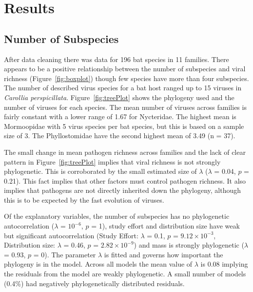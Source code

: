 
\section{Results}


\subsection{Number of Subspecies}

After data cleaning there was data for 196 bat species in 11 families.
There appears to be a positive relationship between the number of subspecies and viral richness (Figure~\ref{fig:boxplot}) though few species have more than four subspecies. 
The number of described virus species for a bat host ranged up to 15 viruses in \emph{Carollia perspicillata}.
Figure~\ref{fig:treePlot} shows the phylogeny used and the number of viruses for each species.
The mean number of viruses across families is fairly constant with a lower range of 1.67 for Nycteridae.
The highest mean is Mormoopidae with 5 virus species per bat species, but this is based on a sample size of 3.
The Phyllostomidae have the second highest mean  of 3.49 (n = 37).

The small change in mean pathogen richness across families and the lack of clear pattern in Figure~\ref{fig:treePlot} implies that viral richness is not strongly phylogenetic. 
This is corroborated by the small estimated size of $\lambda$ ($\lambda$ = 0.04, $p$ = 0.21).
This fact implies that other factors must control pathogen richness.
It also implies that pathogens are not directly inherited down the phylogeny, although this is to be expected by the fast evolution of viruses.

Of the explanatory variables, the number of subspecies has no phylogenetic autocorrelation ($\lambda$ = \ensuremath{10^{-6}}, $p$ = 1), study effort and distribution size have weak but significant autocorrelation (Study Effort: $\lambda$ = 0.1, $p$ = \ensuremath{9.12\times 10^{-3}}, Distribution size: $\lambda$ = 0.46, $p$ = \ensuremath{2.82\times 10^{-9}}) and mass is strongly phylogenetic ($\lambda$ = 0.93, $p$ = 0). 
The parameter $\lambda$ is fitted and governs how important the phylogeny is in the model.
Across all models the mean value of $\lambda$ is 0.08 implying the residuals from the model are weakly phylogenetic.
A small number of models (0.4\%)  had negatively phylogenetically distributed residuals.


